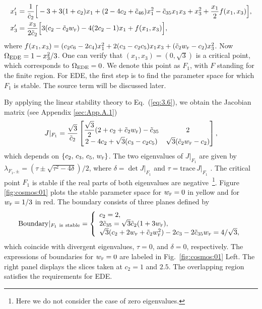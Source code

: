 \documentclass[aps,prd,twocolumn]{revtex4-2}
\newcommand\subEDE{{\rm EDE}}
\newcommand\subF{\textsc{f}}
\begin{document}
\begin{widetext}
\begin{subequations}\label{eq:3.6}
\begin{align}
  x_1^\prime &= \frac{1}{\tilde{c}_2}\Big[-3 + 3(1+c_2)x_1 + (2-4c_2+\tilde{c}_{46})x_1^2 - \tilde{c}_{35}x_1x_3 + x_3^2 + \frac{x_1}{2}f(x_1,x_3)\Big], \\
  x_3^\prime &= \frac{x_3}{2\tilde{c}_2}\Big[3(c_2-\tilde{c}_2w_\subF) - 4(2c_2-1)x_1 + f(x_1,x_3)\Big],
\end{align}
\end{subequations}
where $f(x_1,x_3)=(c_2c_6-2c_4)x_1^2 + 2(c_3-c_2c_5)x_1x_3 + (\tilde{c}_2w_\subF-c_2)x_3^2$. Now $\Omega_\subEDE=1-x_3^2/3$. One can verify that $(x_1,x_3)=(0,\sqrt{3})$ is a critical point, which corresponds to $\Omega_\subEDE=0$. We denote this point as $F_1$, with $F$ standing for the finite region. For EDE, the first step is to find the parameter space for which $F_1$ is stable. The source term will be discussed later.

By applying the linear stability theory to Eq.~(\ref{eq:3.6}), we obtain the Jacobian matrix (see Appendix \ref{sec:App.A.1})
\begin{equation}\label{eq:3.7}
  J|_{F_1} =
  \frac{\sqrt{3}}{\tilde{c}_2}
  \begin{bmatrix}
    \displaystyle \frac{\sqrt{3}}{2}(2+c_2+\tilde{c}_2w_\subF)-\tilde{c}_{35}  &  2 \\
    \displaystyle 2-4c_2+\sqrt{3}(c_3-c_2c_5)  &  \sqrt{3}(\tilde{c}_2w_\subF - c_2)
  \end{bmatrix},
\end{equation}
which depends on $\{c_2,\,c_3,\,c_5,\,w_\subF\}$. The two eigenvalues of $J|_{F_1}$ are given by $\lambda_{F_1,\pm}=(\tau\pm\sqrt{\tau^2-4\delta})/2$, where $\delta=\det J|_{F_1}$ and $\tau=\mathrm{trace}\,J|_{F_1}$ \cite{Perko2001.book}. The critical point $F_1$ is stable if the real parts of both eigenvalues are negative~\footnote{Here we do not consider the case of zero eigenvalues.}. Figure \ref{fig:cosmos:01} plots the stable parameter space for $w_\subF=0$ in yellow and for $w_\subF=1/3$ in red. The boundary consists of three planes defined by
\begin{equation}\label{eq:3.8}
  \mathrm{Boundary}|_{F_1\mathrm{\ is\ stable}} = \left\{
  \begin{array}{l}
    c_2=2, \\
    2\tilde{c}_{35} = \sqrt{3}\tilde{c}_2(1+3w_\subF), \\
    \sqrt{3}(c_2+2w_\subF+\tilde{c}_2w_\subF^2) - 2c_3 - 2\tilde{c}_{35}w_\subF = 4/\sqrt{3},
  \end{array}
  \right.
\end{equation}
which coincide with divergent eigenvalues, $\tau=0$, and $\delta=0$, respectively. The expressions of boundaries for $w_\subF=0$ are labeled in Fig.~\ref{fig:cosmos:01} Left. The right panel displays the slices taken at $c_2=1$ and $2.5$. The overlapping region satisfies the requirements for EDE.
\end{widetext}
\end{document}

